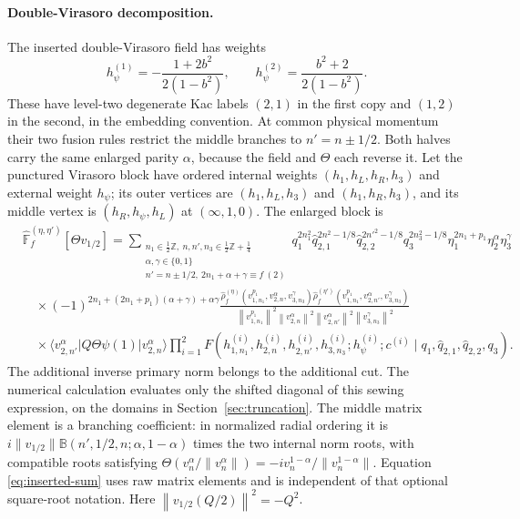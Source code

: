 \documentclass[11pt]{article}
\newcommand{\hFF}{\widehat{\mathbb F}}
\newcommand{\norm}[1]{\left\|#1\right\|^2}
\numberwithin{equation}{section}
\begin{document}
\paragraph{Double-Virasoro decomposition.}
The inserted double-Virasoro field has weights
\begin{equation}
 h_\psi^{(1)}=-\frac{1+2b^2}{2(1-b^2)},\qquad
 h_\psi^{(2)}=\frac{b^2+2}{2(1-b^2)}.
\end{equation}
These have level-two degenerate Kac labels $(2,1)$ in the first copy and
$(1,2)$ in the second, in the embedding convention. At common physical momentum
their two fusion rules restrict the middle branches to
$n'=n\pm1/2$. Both halves carry the same enlarged parity $\alpha$,
because the field and $\Theta$ each reverse it.
Let the punctured Virasoro block have ordered internal weights
$(h_1,h_L,h_R,h_3)$ and external weight $h_\psi$; its outer vertices are
$(h_1,h_L,h_3)$ and $(h_1,h_R,h_3)$, and its middle vertex is
$(h_R,h_\psi,h_L)$ at $(\infty,1,0)$.
The enlarged block is
\begin{align}
 &\hFF_f^{(\eta,\eta')}[\Theta v_{1/2}]
 =\sum_{\substack{n_1\in\frac12\mathbb Z,\ n,n',n_3\in\frac12\mathbb Z+\frac14\\
 \alpha,\gamma\in\{0,1\}\\
 n'=n\pm1/2,\ 2n_1+\alpha+\gamma\equiv f\ (2)}}
 q_1^{2n_1^2}\hat q_{2,1}^{2n^2-1/8}
 \hat q_{2,2}^{2n'^2-1/8}q_3^{2n_3^2-1/8}
 \eta_1^{2n_1+p_1}\eta_2^\alpha\eta_3^\gamma\nonumber\\
 &\quad\times(-1)^{2n_1+(2n_1+p_1)(\alpha+\gamma)+\alpha\gamma}
 \frac{\hat\rho_f^{(\eta)}(v_{1,n_1}^{p_1},v_{2,n}^\alpha,v_{3,n_3}^\gamma)
       \hat\rho_f^{(\eta')}(v_{1,n_1}^{p_1},v_{2,n'}^\alpha,v_{3,n_3}^\gamma)}
 {\norm{v_{1,n_1}^{p_1}}\norm{v_{2,n}^\alpha}\norm{v_{2,n'}^\alpha}
  \norm{v_{3,n_3}^\gamma}}\nonumber\\
 &\quad\times\langle v_{2,n'}^\alpha|Q\Theta\psi(1)|v_{2,n}^\alpha\rangle
 \prod_{i=1}^2
 F(h_{1,n_1}^{(i)},h_{2,n}^{(i)},h_{2,n'}^{(i)},h_{3,n_3}^{(i)};
   h_\psi^{(i)};c^{(i)}\mid q_1,\hat q_{2,1},\hat q_{2,2},q_3).
 \label{eq:inserted-sum}
\end{align}
The additional inverse primary norm belongs to the additional cut.
The numerical calculation evaluates only the shifted diagonal of this
sewing expression, on the domains in Section~\ref{sec:truncation}.
The middle matrix element is a branching coefficient: in normalized radial
ordering it is $i\|v_{1/2}\|
\mathbb B(n',1/2,n;\alpha,1-\alpha)$ times the two internal norm roots,
with compatible roots satisfying $\Theta(v_n^\alpha/\|v_n^\alpha\|)
=-i v_n^{1-\alpha}/\|v_n^{1-\alpha}\|$.
Equation \eqref{eq:inserted-sum} uses raw matrix elements and is independent
of that optional square-root notation. Here $\norm{v_{1/2}(Q/2)}=-Q^2$.
\end{document}
